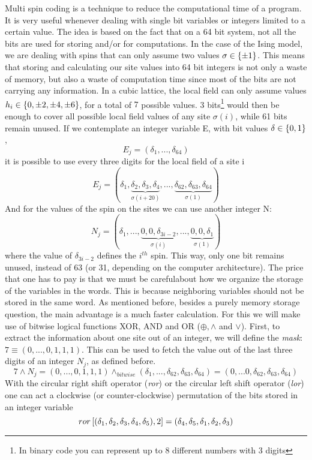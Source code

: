 Multi spin coding is a technique to reduce the computational time of a program. It is very useful whenever dealing with single bit variables or integers limited to a certain value. The idea is based on the fact that on a 64 bit system, not all the bits are used for storing and/or for computations. In the case of the Ising model, we are dealing with spins that can only assume two values $\sigma \in \left\{\pm 1\right\}$. This means that storing and calculating our site values into 64 bit integers is not only a waste of memory, but also a waste of computation time since most of the bits are not carrying any information. In a cubic lattice, the local field can only assume values $h_i \in\left\{0, \pm 2, \pm 4, \pm 6\right\} $, for a total of $7$ possible values. 3 bits\footnote{In binary code you can represent up to 8 different numbers with 3 digits} would then be enough to cover all possible local field values of any site $\sigma(i)$, while 61 bits remain unused. If we contemplate an integer variable E, with bit values $\delta \in \left\{0,1\right\}$,
$$
E_j = (\delta_1,...,\delta_{64})
$$
it is possible to use every three digits for the local field of a site i
\begin{equation}
E_j = (\delta_1,\underbrace{\delta_{2},\delta_{3},\delta_{4}}_{\sigma(i+20)},...,\underbrace{\delta_{62},\delta_{63},\delta_{64}}_{\sigma(1)})
\end{equation} 
And for the values of the spin on the sites we can use another integer N:
\begin{equation}
N_j = (\delta_1,...,\underbrace{0,0,\delta_{3i-2}}_{\sigma(i)},...,\underbrace{0,0,\delta_{1}}_{\sigma(1)})
\end{equation} where the value of $\delta_{3i-2}$ defines the $i^{th}$ spin. This way, only one bit remains unused, instead of 63 (or 31, depending on the computer architecture). The price that one has to pay is that we must be carefulabout how we organize the storage of the variables in the words. This is because neighboring variables should not be stored in the same word.  As mentioned before, besides a purely memory storage question, the main advantage is a much faster calculation. For this we will make use of bitwise logical functions XOR, AND and OR ($\oplus, \wedge$ and $\lor$). First, to extract the information about one site out of an integer, we will define the \emph{mask}: $7 \equiv (0,...,0,1,1,1)$. This can be used to fetch the value out of the last three digits of an integer $N_j$, as defined before.
\begin{equation}
7\wedge N_j = (0,...,0,1,1,1) \wedge_{bitwise} (\delta_1,...,\delta_{62},\delta_{63},\delta_{64}) = (0,...0,\delta_{62},\delta_{63},\delta_{64})
\label{eq:fetch}
\end{equation}
With the circular right shift operator (\emph{ror}) or the circular left shift operator (\emph{lor}) one can act a clockwise (or counter-clockwise) permutation of the bits stored in an integer variable
\begin{equation}
ror\left[(\delta_1,\delta_2,\delta_3,\delta_4,\delta_5),2\right] = (\delta_4,\delta_5,\delta_1,\delta_2,\delta_3)
\label{eq:ror}
\end{equation}


